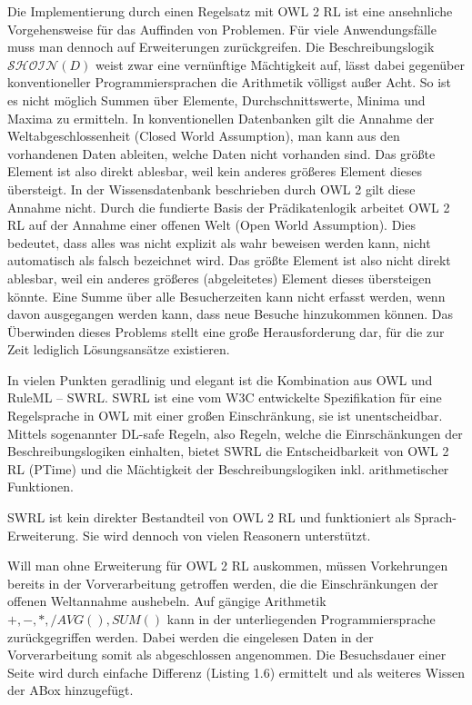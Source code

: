 \documentclass[runningheads,a4paper]{llncs}
\begin{document}
Die Implementierung durch einen Regelsatz mit OWL 2 RL ist eine ansehnliche Vorgehensweise für das Auffinden von Problemen. 
Für viele Anwendungsfälle muss man dennoch auf Erweiterungen zurückgreifen. 
Die Beschreibungslogik \(\mathcal{SHOIN}(D)\) weist zwar eine vernünftige Mächtigkeit auf, lässt dabei gegenüber konventioneller Programmiersprachen die Arithmetik völligst außer Acht. 
So ist es nicht möglich Summen über Elemente, Durchschnittswerte, Minima und Maxima zu ermitteln. 
In konventionellen Datenbanken gilt die Annahme der Weltabgeschlossenheit (Closed World Assumption), man kann aus den vorhandenen Daten ableiten, welche Daten nicht vorhanden sind. 
Das größte Element ist also direkt ablesbar, weil kein anderes größeres Element dieses übersteigt. 
In der Wissensdatenbank beschrieben durch OWL 2 gilt diese Annahme nicht. 
Durch die fundierte Basis der Prädikatenlogik arbeitet OWL 2 RL auf der Annahme einer offenen Welt (Open World Assumption). 
Dies bedeutet, dass alles was nicht explizit als wahr beweisen werden kann, nicht automatisch als falsch bezeichnet wird. 
Das größte Element ist also nicht direkt ablesbar, weil ein anderes größeres (abgeleitetes) Element dieses übersteigen könnte. 
Eine Summe über alle Besucherzeiten kann nicht erfasst werden, wenn davon ausgegangen werden kann, dass neue Besuche hinzukommen können.
Das Überwinden dieses Problems stellt eine große Herausforderung dar, für die zur Zeit lediglich Lösungsansätze existieren. 

In vielen Punkten geradlinig und elegant ist die Kombination aus OWL und RuleML -- SWRL. 
SWRL ist eine vom W3C entwickelte Spezifikation für eine Regelsprache in OWL mit einer großen Einschränkung, sie ist unentscheidbar. 
Mittels sogenannter DL-safe Regeln, also Regeln, welche die Einrschänkungen der Beschreibungslogiken einhalten, bietet SWRL die Entscheidbarkeit von OWL 2 RL (PTime) und die Mächtigkeit der Beschreibungslogiken inkl. arithmetischer Funktionen. 

SWRL ist kein direkter Bestandteil von OWL 2 RL und funktioniert als Sprach-Erweiterung. 
Sie wird dennoch von vielen Reasonern unterstützt.

Will man ohne Erweiterung für OWL 2 RL auskommen, müssen Vorkehrungen bereits in der Vorverarbeitung getroffen werden, die die Einschränkungen der offenen Weltannahme aushebeln. 
Auf gängige Arithmetik \(+, -, *, / AVG(), SUM() \) kann in der unterliegenden Programmiersprache zurückgegriffen werden.
Dabei werden die eingelesen Daten in der Vorverarbeitung somit als abgeschlossen angenommen.
Die Besuchsdauer einer Seite wird durch einfache Differenz (Listing 1.6) ermittelt und als weiteres Wissen der ABox hinzugefügt.
\end{document}
